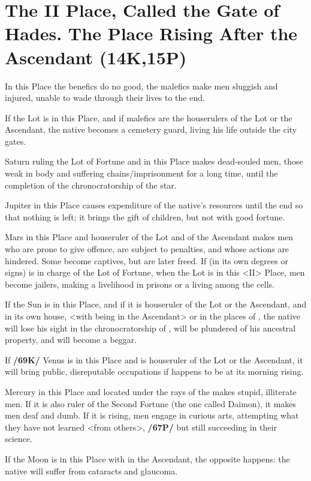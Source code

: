 \section{The II Place, Called the Gate of Hades. The Place Rising After the Ascendant (14K,15P)}

In this Place the benefics do no good, the malefics make men sluggish and injured, unable to wade through their lives to the end. 

If the Lot is in this Place, and if malefics are the houserulers of the Lot or the Ascendant, the native becomes a cemetery guard, living his life outside the city gates. 

Saturn ruling the Lot of Fortune and in this Place makes dead-souled men, those weak in body and suffering
chains/imprisonment for a long time, until the completion of the chronocratorship of the star. 

Jupiter in this Place causes expenditure of the native’s resources until the end so that nothing is left; it brings the gift of children, but not with good fortune. 

Mars in this Place and houseruler of the Lot and of the Ascendant makes men who are prone to give offence, are subject to penalties, and whose actions are hindered. Some become captives, but are later freed. If \Mars\xspace (in its own degrees or signs) is in charge of the Lot of Fortune, when the Lot is in this <II> Place, men become jailers, making a livelihood in prisons or a living among the cells. 

If the Sun is in this Place, and if it is houseruler of the Lot or the Ascendant, and in its own house, <with \Mars\xspace being in the Ascendant> or in the places of \Saturn, the native will lose his sight in the chronocratorship of \Mars, will be plundered of his ancestral property, and will become a beggar. 

If \textbf{/69K/} Venus is in this Place and is houseruler of the Lot or the Ascendant, it will bring public, disreputable occupations if \Venus\xspace happens to be at its morning rising. 

Mercury in this Place and located under the rays of the \Sun\xspace makes stupid, illiterate men. If it is also ruler of the Second Fortune (the one called Daimon), it makes men deaf and dumb. If it is rising, men engage in curious arts, attempting what they have not learned <from others>, \textbf{/67P/} but still succeeding in their science. 

If the Moon is in this Place with \Saturn\xspace in the Ascendant, the opposite happens: the native will suffer from cataracts and glaucoma.

\newpage